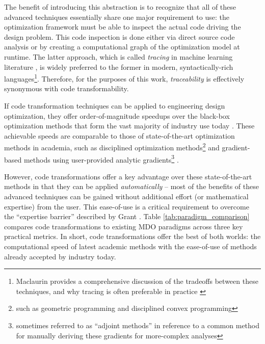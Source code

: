 \documentclass[12pt,vi,oneside]{report}
\begin{document}
    The benefit of introducing this abstraction is to recognize that all of these advanced techniques essentially share one major requirement to use: the optimization framework must be able to inspect the actual code driving the design problem. This code inspection is done either via direct source code analysis or by creating a computational graph of the optimization model at runtime. The latter approach, which is called \textit{tracing} in machine learning literature \cite{jax, frostig_compiling_2018, baydin_automatic_2018}, is widely preferred to the former in modern, syntactically-rich languages\footnote{Maclaurin provides a comprehensive discussion of the tradeoffs between these techniques, and why tracing is often preferable in practice \cite{maclaurin_modeling_2016}}. Therefore, for the purposes of this work, \textit{traceability} is effectively synonymous with code transformability.

    If code transformation techniques can be applied to engineering design optimization, they offer order-of-magnitude speedups over the black-box optimization methods that form the vast majority of industry use today \cite{martins_engineering_2021, lavin_simulation_2022}. These achievable speeds are comparable to those of state-of-the-art optimization methods in academia, such as disciplined optimization methods\footnote{such as geometric programming and disciplined convex programming} \cite{grant_disciplined_2006, gpkit, boyd_convex_2004, agrawal_disciplined_2019} and gradient-based methods using user-provided analytic gradients\footnote{sometimes referred to as ``adjoint methods'' in reference to a common method for manually deriving these gradients for more-complex analyses} \cite{gray_openmdao_2019, kenway_effective_2019, innes_don_2019}.

    However, code transformations offer a key advantage over these state-of-the-art methods in that they can be applied \textit{automatically} -- most of the benefits of these advanced techniques can be gained without additional effort (or mathematical expertise) from the user. This ease-of-use is a critical requirement to overcome the ``expertise barrier'' described by Grant \cite{grant_disciplined_2006}. Table \ref{tab:paradigm_comparison} compares code transformations to existing MDO paradigms across three key practical metrics. In short, code transformations offer the best of both worlds: the computational speed of latest academic methods with the ease-of-use of methods already accepted by industry today.
\end{document}
